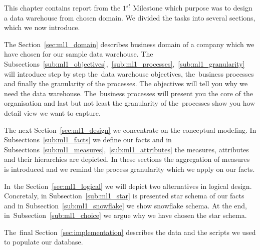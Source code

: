 This chapter contains report from the $1^{st}$  Milestone which purpose was to design a data warehouse from chosen domain. We divided the tasks into several sections, which we now introduce.

The Section~\ref{sec:ml1_domain} describes business domain of a company which we have chosen for our sample data warehouse. The Subsections~\ref{sub:ml1_objectives},~\ref{sub:ml1_processes},~\ref{sub:ml1_granularity} will introduce  step by step the~data warehouse objectives, the~business processes and finally the granularity of the processes. The objectives will tell you why we need the data warehouse. The~business processes will present you the core of the organisation and last but not least the granularity of the~processes show you how detail view we want to capture.

The next Section~\ref{sec:ml1_design} we concentrate on the conceptual modeling. In Subsections~\ref{sub:ml1_facts} we define our facts and in Subsections~\ref{sub:ml1_measures},~\ref{sub:ml1_attributes} the measures, attributes and their hierarchies are depicted. In these sections the aggregation of measures is introduced and we remind the process granularity which we apply on our facts.

In~the Section~\ref{sec:ml1_logical} we will depict two alternatives in logical design. Concretaly, in Subsection~\ref{sub:ml1_star} is presented star schema of our facts and in Subsection~\ref{sub:ml1_snowflake} we show snowflake schema. At the end, in~Subsection~\ref{sub:ml1_choice} we argue why we have chosen the star schema. 

The~final Section~\ref{sec:implementation} describes the data and the scripts we used to populate our database. 
